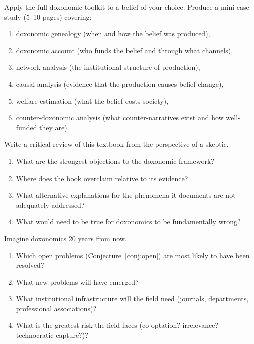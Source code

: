 \begin{exercise}
Apply the full doxonomic toolkit to a belief of your choice.
Produce a mini case study (5--10 pages) covering:
\begin{enumerate}[nosep]
  \item doxonomic genealogy (when and how the belief was produced),
  \item doxonomic account (who funds the belief and through what channels),
  \item network analysis (the institutional structure of production),
  \item causal analysis (evidence that the production causes belief change),
  \item welfare estimation (what the belief costs society),
  \item counter-doxonomic analysis (what counter-narratives exist and how well-funded they are).
\end{enumerate}
\end{exercise}

\begin{exercise}
Write a critical review of this textbook from the perspective of a skeptic.
\begin{enumerate}[nosep]
  \item What are the strongest objections to the doxonomic framework?
  \item Where does the book overclaim relative to its evidence?
  \item What alternative explanations for the phenomena it documents are not adequately addressed?
  \item What would need to be true for doxonomics to be fundamentally wrong?
\end{enumerate}
\end{exercise}

\begin{exercise}
Imagine doxonomics 20 years from now.
\begin{enumerate}[nosep]
  \item Which open problems (Conjecture~\ref{conj:open}) are most likely to have been resolved?
  \item What new problems will have emerged?
  \item What institutional infrastructure will the field need (journals, departments, professional associations)?
  \item What is the greatest risk the field faces (co-optation? irrelevance? technocratic capture?)?
\end{enumerate}
\end{exercise}
